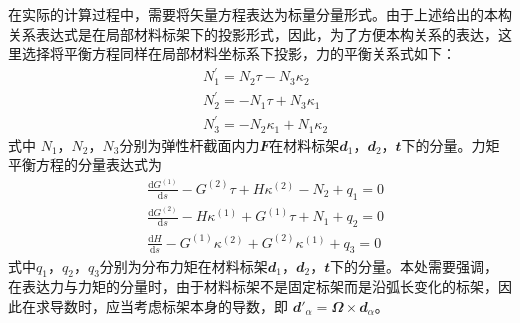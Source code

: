 在实际的计算过程中，需要将矢量方程表达为标量分量形式。由于上述给出的本构关系表达式是在局部材料标架下的投影形式，因此，为了方便本构关系的表达，这里选择将平衡方程同样在局部材料坐标系下投影，力的平衡关系式如下：
\begin{equation}
	\begin{split}
	&N_{1}^{\prime}=N_{2} \tau-N_{3} \kappa_{2}\\
	&N_{2}^{\prime}=-N_{1} \tau+N_{3} \kappa_{1}\\
	&N_{3}^{\prime}=-N_{2} \kappa_{1}+N_{1} \kappa_{2}
	\end{split}
\end{equation}
式中 $N_1$，$N_2$，$N_3$分别为弹性杆截面内力$\mathbfit{F}$在材料标架$\mathbfit{d_1}$，$\mathbfit{d_2}$，$\mathbfit{t}$下的分量。力矩平衡方程的分量表达式为
\begin{equation}
	\begin{split}
	&\frac{\mathrm{d} G^{(1)}}{\mathrm{d} s}-G^{(2)} \tau+H \kappa^{(2)}-N_{2}+q_{1}=0 \\
	&\frac{\mathrm{d} G^{(2)}}{\mathrm{d} s}-H \kappa^{(1)}+G^{(1)} \tau+N_{1}+q_{2}=0 \\
	&\frac{\mathrm{d} H}{\mathrm{d} s}-G^{(1)} \kappa^{(2)}+G^{(2)} \kappa^{(1)}+q_{3}=0
	\end{split}
\end{equation}
式中$q_{1}$，$q_{2}$，$q_{3}$分别为分布力矩在材料标架$\mathbfit{d_1}$，$\mathbfit{d_2}$，$\mathbfit{t}$下的分量。本处需要强调，在表达力与力矩的分量时，由于材料标架不是固定标架而是沿弧长变化的标架，因此在求导数时，应当考虑标架本身的导数，即	$\mathbfit{d}'_{\alpha}=\mathbfit{\Omega}\times\mathbfit{d}_{\alpha}$。
